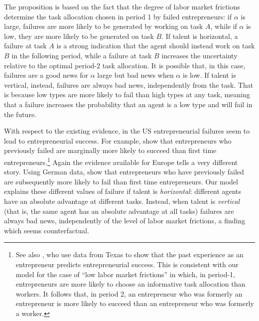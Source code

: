 \documentclass[12pt,american]{paper}
\theoremstyle{remark}
\begin{document}
The proposition is based on the fact that the degree of labor market frictions determine the task allocation chosen in period 1 by failed entrepreneurs: if $\alpha$ is large, failures are more likely to be generated by working on task $A$, while if $\alpha$ is low, they are more likely to be generated on task $B$. If talent is horizontal, a failure at task $A$ is a strong indication that the agent should instead work on task $B$ in the following period, while a failure at task $B$ increases the uncertainty relative to the optimal period-2 task allocation. It is possible that, in this case, failures are a good news for $\alpha$ large but bad news when $\alpha$ is low. If talent is vertical, instead, failures are always bad news, independently from the task. That is because low types are more likely to fail than high types at any task, meaning that a failure increases the probability that an agent is a low type and will fail in the future.


With respect to the existing evidence, in the US entrepreneurial failures seem to lead to entrepreneurial success. For example, \citet*{gompers2010performance} show that entrepreneurs who previously failed are marginally more likely to succeed than first time entrepreneurs.\footnote{See also \cite{NBERw20312}, who use data from Texas to show that the past experience as an entrepreneur predicts entrepreneurial success. This is consistent with our model for the case of ``low labor market frictions'' in which, in period-1, entrepreneurs are more likely to choose an informative task allocation than workers. It follows that, in period 2, an entrepreneur who was formerly an entrepreneur is more likely to succeed than an entrepreneur who was formerly a worker.}
Again the evidence available for Europe tells a very different story.  
Using German data, \citet*{gottshalkGreene2012} show that entrepreneurs who have previously failed are subsequently more likely to fail than first time entrepreneurs. %
Our model explains these different values of failure if talent is \emph{horizontal}: different agents have  
an absolute advantage at different tasks.  Instead, when talent is \emph{vertical} (that is, the same agent has an absolute advantage at all tasks) failures are always bad news, independently of the level of labor market frictions, a finding which seems counterfactual. 
\end{document}
